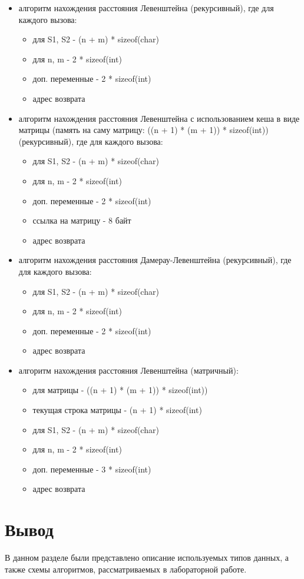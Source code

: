 \begin{itemize}
    \item алгоритм нахождения расстояния Левенштейна (рекурсивный), где для каждого вызова:

    \begin{itemize}
        \item для S1, S2 - (n + m) * sizeof(char)
        \item для n, m - 2 * sizeof(int)
        \item доп. переменные - 2 * sizeof(int)
        \item адрес возврата
    \end{itemize}

    \item алгоритм нахождения расстояния Левенштейна с использованием кеша в виде матрицы (память на саму матрицу: ((n + 1) * (m + 1)) * sizeof(int)) (рекурсивный), где для каждого вызова:

    \begin{itemize}
        \item для S1, S2 - (n + m) * sizeof(char)
        \item для n, m - 2 * sizeof(int)
        \item доп. переменные - 2 * sizeof(int)
        \item ссылка на матрицу - 8 байт
        \item адрес возврата
    \end{itemize}

    \item алгоритм нахождения расстояния Дамерау-Левенштейна (рекурсивный), где для каждого вызова:

    \begin{itemize}
        \item для S1, S2 - (n + m) * sizeof(char)
        \item для n, m - 2 * sizeof(int)
        \item доп. переменные - 2 * sizeof(int)
        \item адрес возврата
    \end{itemize}


    \item алгоритм нахождения расстояния Левенштейна (матричный):

    \begin{itemize}
        \item для матрицы - ((n + 1) * (m + 1)) * sizeof(int)) 
        \item текущая строка матрицы - (n + 1) * sizeof(int)
        \item для S1, S2 - (n + m) * sizeof(char)
        \item для n, m - 2 * sizeof(int)
        \item доп. переменные - 3 * sizeof(int)
        \item адрес возврата
    \end{itemize}
\end{itemize}

\section{Вывод}
В данном разделе были представлено описание используемых типов данных, а также схемы алгоритмов, рассматриваемых в лабораторной работе.